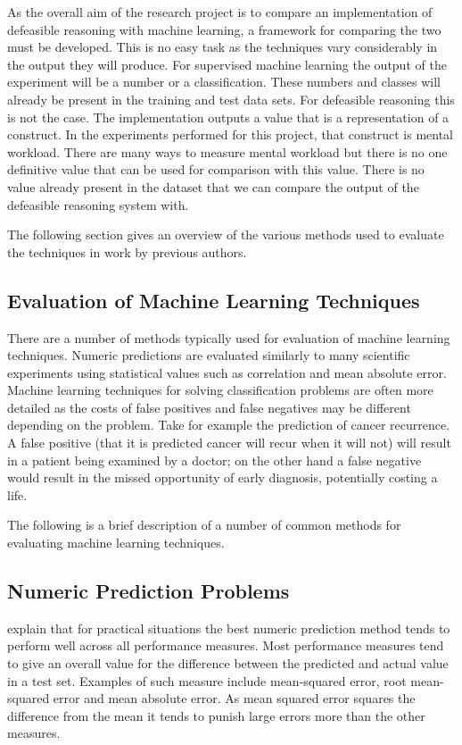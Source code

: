 As the overall aim of the research project is to compare an implementation of defeasible reasoning with machine learning, a framework for comparing the two must be developed. This is no easy task as the techniques vary considerably in the output they will produce. For supervised machine learning the output of the experiment will be a number or a classification. These numbers and classes will already be present in the training and test data sets. For defeasible reasoning this is not the case. The implementation outputs a value that is a representation of a construct. In the experiments performed for this project, that construct is mental workload. There are many ways to measure mental workload but there is no one definitive value that can be used for comparison with this value. There is no value already present in the dataset that we can compare the output of the defeasible reasoning system with.

The following section gives an overview of the various methods used to evaluate the techniques in work by previous authors.

\subsection{Evaluation of Machine Learning Techniques}\cite{witten2005data}

There are a number of methods typically used for evaluation of machine learning techniques. Numeric predictions are evaluated similarly to many scientific experiments using statistical values such as correlation and mean absolute error. Machine learning techniques for solving classification problems are often more detailed as the costs of false positives and false negatives may be different depending on the problem. Take for example the prediction of cancer recurrence. A false positive (that it is predicted cancer will recur when it will not) will result in a patient being examined by a doctor; on the other hand a false negative would result in the missed opportunity of early diagnosis, potentially costing a life.

The following is a brief description of a number of common methods for evaluating machine learning techniques.

\subsection{Numeric Prediction Problems}

\cite{witten2005data} explain that for practical situations the best numeric prediction method tends to perform well across all performance measures. Most performance measures tend to give an overall value for the difference between the predicted and actual value in a test set. Examples of such measure include mean-squared error, root mean-squared error and mean absolute error. As mean squared error squares the difference from the mean it tends to punish large errors more than the other measures.

